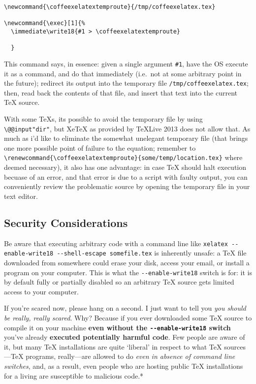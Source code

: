 \begin{verbatim}
\newcommand{\coffeexelatextemproute}{/tmp/coffeexelatex.tex}

\newcommand{\exec}[1]{%
  \immediate\write18{#1 > \coffeexelatextemproute}
  
  }
\end{verbatim}

This command says, in essence: given a single argument \texttt{\#1},
have the OS execute it as a command, and do that immediately (i.e.~not
at some arbitrary point in the future); redirect its output into the
temporary file \texttt{/tmp/coffeexelatex.tex}; then, read back the
contents of that file, and insert that text into the current TeX source.

With some TeXs, its possible to avoid the temporary file by using
\texttt{\textbackslash{}@@input\textbar{}"dir"}, but XeTeX as provided
by TeXLive 2013 does not allow that. As much as i'd like to eliminate
the somewhat unelegant temporary file (that brings one more possible
point of failure to the equation; remember to
\texttt{\textbackslash{}renewcommand\{\textbackslash{}coffeexelatextemproute\}\{some/temp/location.tex\}}
where deemed necessary), it also has one advantage: in case TeX should
halt execution becuase of an error, and that error is due to a script
with faulty output, you can conveniently review the problematic source
by opening the temporary file in your text editor.

\subsection{Security Considerations}\label{security-considerations}

Be aware that executing arbitrary code with a command line like
\texttt{xelatex -{}-enable-write18 -{}-shell-escape somefile.tex} is
inherently unsafe: a TeX file downloaded from somewhere could erase your
disk, access your email, or install a program on your computer. This is
what the \texttt{-{}-enable-write18} switch is for: it is by default
fully or partially disabled so an arbitrary TeX source gets limited
access to your computer.

If you're scared now, please hang on a second. I just want to tell you
\emph{you should be really, really scared}. Why? Because if you ever
downloaded some TeX source to compile it on your machine \textbf{even
without the \texttt{-{}-enable-write18} switch} you've already
\textbf{executed potentially harmful code}. Few people are aware of it,
but many TeX installations are quite `liberal' in respect to what TeX
sources---TeX programs, really---are allowed to do \emph{even in absence
of command line switches}, and, as a result, even people who are hosting
public TeX installations for a living are susceptible to malicious
code.*

